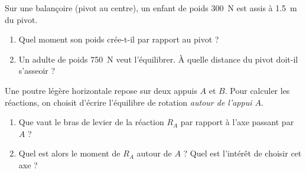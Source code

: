 \documentclass[11pt,a4paper]{article}
\begin{document}
\begin{exo}[la balançoire]
Sur une balançoire (pivot au centre), un enfant de poids \qty{300}{N} est assis à \qty{1.5}{m} du
pivot.
\begin{enumerate}[label=\alph*)]
  \item Quel moment son poids crée-t-il par rapport au pivot ?
  \item Un adulte de poids \qty{750}{N} veut l'équilibrer. À quelle distance du pivot doit-il s'asseoir ?
\end{enumerate}
\end{exo}

\begin{exo}
Une poutre légère horizontale repose sur deux appuis $A$ et $B$. Pour calculer les réactions, on
choisit d'écrire l'équilibre de rotation \emph{autour de l'appui $A$}.
\begin{enumerate}[label=\alph*)]
  \item Que vaut le bras de levier de la réaction $R_A$ par rapport à l'axe passant par $A$ ?
  \item Quel est alors le moment de $R_A$ autour de $A$ ? Quel est l'intérêt de choisir cet axe ?
\end{enumerate}
\end{exo}
\end{document}

